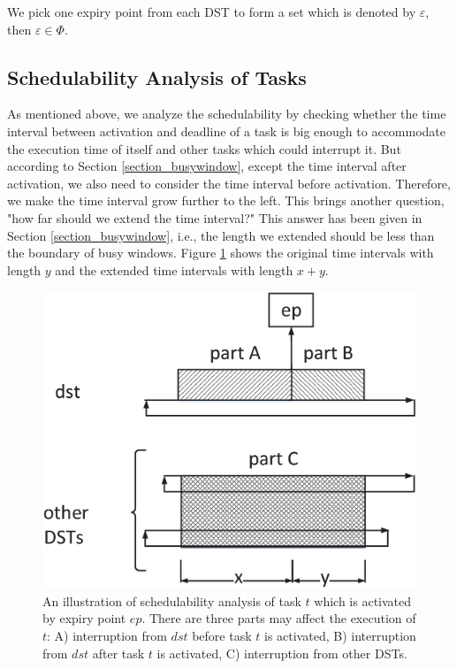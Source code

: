 \documentclass[sigconf]{acmart}
\begin{document}
We pick one expiry point from each DST to form a set which is denoted by $\varepsilon$, then $\varepsilon\in\Phi$.
\subsection{Schedulability Analysis of Tasks}
As mentioned above, we analyze the schedulability by checking whether the time interval between activation and deadline of a task is big enough to accommodate the execution time of itself and other tasks which could interrupt it. But according to Section \ref{section_busywindow}, except the time interval after activation, we also need to consider the time interval before activation. Therefore, we make the time interval grow further to the left. This brings another question, "how far should we extend the time interval?" This answer has been given in Section \ref{section_busywindow}, i.e., the length we extended should be less than the boundary of busy windows. Figure \ref{figure_3parts} shows the original time intervals with length $y$ and the extended time intervals with length $x+y$.
\begin{figure}
  \centering
  \includegraphics[scale=0.25]{graphics/figure_3parts.eps}
  \caption{An illustration of schedulability analysis of task $t$ which is activated by expiry point $ep$. There are three parts may affect the execution of $t$: A) interruption from $dst$ before task $t$ is activated, B) interruption from $dst$ after task $t$ is activated, C) interruption from other DSTs.}
  \label{figure_3parts}
\end{figure}
\end{document}
